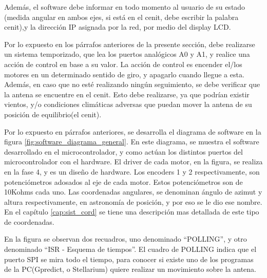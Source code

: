Además, el software debe informar en todo momento al usuario de su estado (medida angular en ambos ejes, si está en el cenit, debe escribir la palabra cenit),y la dirección IP asignada por la red, por medio del display LCD.  

Por lo expuesto en los párrafos anteriores de la presente sección, debe realizarse un sistema temporizado, que lea los puertos analógicos A0 y A1, y realice una acción de control en base a su valor. La acción de control es encender el/los motores en un determinado sentido de giro, y apagarlo cuando llegue a esta. Además, en caso que no esté realizando ningún seguimiento, se debe verificar que la antena se encuentre en el cenit. Esto debe realizarse, ya que podrían existir vientos, y/o condiciones climáticas adversas que puedan mover la antena de su posición de equilibrio(el cenit). 


Por lo expuesto en párrafos anteriores, se desarrolla el diagrama de software en la figura  \ref{fig:software_diagrama_general}. En este diagrama, se muestra el software desarrollado en el microcontrolador, y como actúan los distintos puertos del microcontrolador con el hardware. El driver de cada motor, en la figura, se realiza en la fase 4, y es un diseño de hardware. Los encoders 1 y 2 respectivamente, son potenciómetros adosados al eje de cada motor. Estos potenciómetros son de 10Kohms cada uno. Las coordenadas angulares, se denominan ángulo de azimut y altura respectivamente, en astronomía de posición, y por eso se le dio ese nombre. En el capítulo \ref{cap:sist_cord} se tiene una descripción mas detallada de este tipo de coordenadas. 

En la figura se observan dos recuadros, uno denominado ``POLLING'', y otro denominado ``ISR - Esquema de tiempos''. El cuadro de POLLING indica que el puerto SPI se mira todo el tiempo, para conocer si existe uno de los programas de la PC(Gpredict, o Stellarium) quiere realizar un movimiento sobre la antena. 



